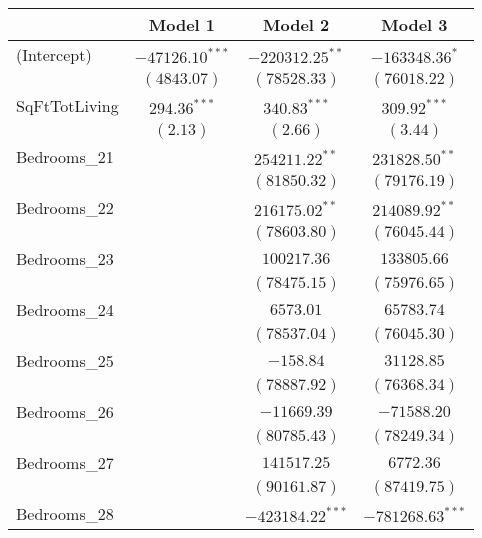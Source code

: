 \documentclass[12pt,letterpaper]{article}
\begin{document}
\begin{table}
	\begin{center}
		\begin{tabular}{l c c c}
			\hline
			& Model 1 & Model 2 & Model 3 \\
			\hline
			(Intercept)                   & $-47126.10^{***}$ & $-220312.25^{**}$  & $-163348.36^{*}$    \\
			& $(4843.07)$       & $(78528.33)$       & $(76018.22)$        \\
			SqFtTotLiving                 & $294.36^{***}$    & $340.83^{***}$     & $309.92^{***}$      \\
			& $(2.13)$          & $(2.66)$           & $(3.44)$            \\
			Bedrooms\_21                  &                   & $254211.22^{**}$   & $231828.50^{**}$    \\
			&                   & $(81850.32)$       & $(79176.19)$        \\
			Bedrooms\_22                  &                   & $216175.02^{**}$   & $214089.92^{**}$    \\
			&                   & $(78603.80)$       & $(76045.44)$        \\
			Bedrooms\_23                  &                   & $100217.36$        & $133805.66$         \\
			&                   & $(78475.15)$       & $(75976.65)$        \\
			Bedrooms\_24                  &                   & $6573.01$          & $65783.74$          \\
			&                   & $(78537.04)$       & $(76045.30)$        \\
			Bedrooms\_25                  &                   & $-158.84$          & $31128.85$          \\
			&                   & $(78887.92)$       & $(76368.34)$        \\
			Bedrooms\_26                  &                   & $-11669.39$        & $-71588.20$         \\
			&                   & $(80785.43)$       & $(78249.34)$        \\
			Bedrooms\_27                  &                   & $141517.25$        & $6772.36$           \\
			&                   & $(90161.87)$       & $(87419.75)$        \\
			Bedrooms\_28                  &                   & $-423184.22^{***}$ & $-781268.63^{***}$  \\

\end{tabular}
\end{center}
\end{table}
\end{document}
